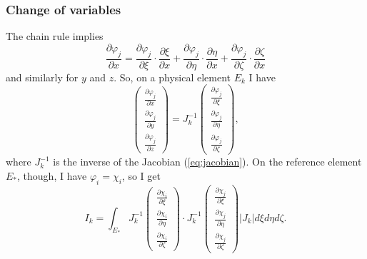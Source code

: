 \documentclass{article}
\begin{document}
\subsubsection{Change of variables}

The chain rule implies
\begin{equation}
\frac{\partial \varphi_j}{\partial x} = \frac{\partial \varphi_j}{\partial
   \xi} \cdot \frac{\partial \xi}{\partial x} + \frac{\partial
   \varphi_j}{\partial \eta} \cdot \frac{\partial \eta}{\partial x} +
   \frac{\partial \varphi_j}{\partial \zeta} \cdot \frac{\partial
   \zeta}{\partial x} \label{eq:chainrule}
 \end{equation}
and similarly for $y$ and $z$. So, on a physical element $E_k$ I have
\begin{equation}
  \left(
    \begin{array}{c}
      \frac{\partial \varphi_j}{\partial x}\\
      \frac{\partial \varphi_j}{\partial y}\\
      \frac{\partial \varphi_j}{\partial z}
   \end{array}
 \right) = J_k^{- 1} \left(
   \begin{array}{c}
     \frac{\partial \varphi_j}{\partial \xi}\\
     \frac{\partial \varphi_j}{\partial \eta}\\
     \frac{\partial \varphi_j}{\partial \zeta}
   \end{array}
 \right),\label{eq:2}
\end{equation}
where $J_k^{- 1}$ is the inverse of the Jacobian (\ref{eq:jacobian}). On the
reference element $E_{\ast}$, though, I have $\varphi_i = \chi_i$, so I get
\begin{equation}
  I_k = \int_{E_{\ast}} J_k^{- 1} \left( \begin{array}{c}
    \frac{\partial \chi_i}{\partial \xi}\\
    \frac{\partial \chi_i}{\partial \eta}\\
    \frac{\partial \chi_i}{\partial \zeta}
  \end{array} \right) \cdot J_k^{- 1} \left( \begin{array}{c}
    \frac{\partial \chi_j}{\partial \xi}\\
    \frac{\partial \chi_j}{\partial \eta}\\
    \frac{\partial \chi_j}{\partial \zeta}
  \end{array} \right) | J_k | d \xi d \eta d \zeta . \label{eq:ikfinal}
\end{equation}
\end{document}

